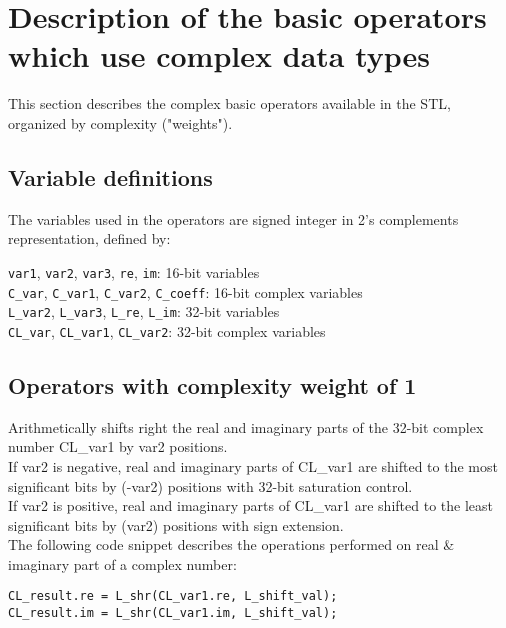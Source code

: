 \section{Description of the basic operators which use complex data types }

This section describes the complex basic operators available in the STL, organized by complexity ("weights").

\subsection{Variable definitions}

The variables used in the operators are signed integer in 2's complements representation, defined by:

{\tt var1}, {\tt var2}, {\tt var3}, {\tt re}, {\tt im}: 16-bit variables\\
{\tt C\_var}, {\tt C\_var1}, {\tt C\_var2}, {\tt C\_coeff}: 16-bit complex variables\\
{\tt L\_var2}, {\tt L\_var3}, {\tt L\_re}, {\tt L\_im}: 32-bit variables\\
{\tt CL\_var}, {\tt CL\_var1}, {\tt CL\_var2}: 32-bit complex variables

\subsection{Operators with complexity weight of 1}


Arithmetically shifts right the real and imaginary parts of the 32-bit complex number CL\_var1 by var2 positions.\\
If var2 is negative, real and imaginary parts of CL\_var1 are shifted to the most significant bits by (-var2) positions with 32-bit saturation control.\\
If var2 is positive, real and imaginary parts of CL\_var1 are shifted to the least significant bits by (var2) positions with sign extension.\\
The following code snippet describes the operations performed on real \& imaginary part of a complex number:

{\tt {}CL\_result.re = L\_shr(CL\_var1.re, L\_shift\_val);\\
CL\_result.im = L\_shr(CL\_var1.im, L\_shift\_val);\\
}

